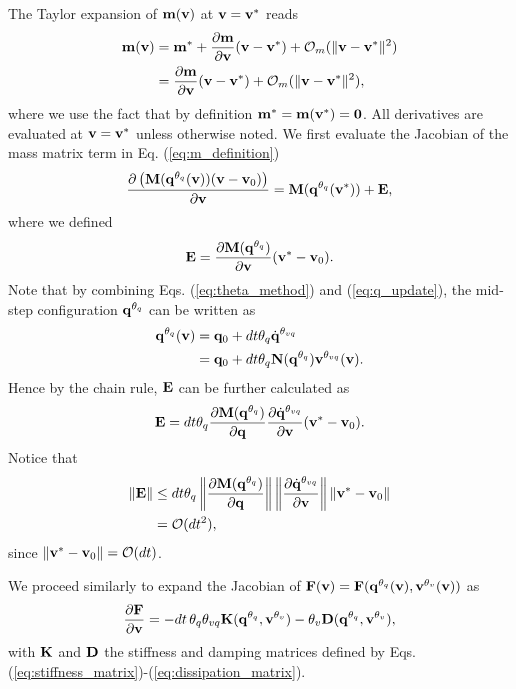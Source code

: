 The Taylor expansion of ${\mathbf{m}}({\mathbf{v}})$ at ${\mathbf{v}}={\mathbf{v}}^*$ reads
\begin{align}
	\mf{m}(\mf{v}) &= \mf{m}^* + \frac{\partial \mf{m}}{\partial \mf{v}} (\mf{v}-\mf{v}^*) +
	\mathcal{O}_m(\Vert\mf{v}-\mf{v}^*\Vert^2)\nonumber\\
	&=\frac{\partial \mf{m}}{\partial \mf{v}}(\mf{v}-\mf{v}^*) +
	\mathcal{O}_m(\Vert\mf{v}-\mf{v}^*\Vert^2),
	\label{eq:m_taylor_expansion}
\end{align}
where we use the fact that by definition ${\mathbf{m}}^*={\mathbf{m}}({\mathbf{v}}^*)={\mathbf{0}}$. All
derivatives are evaluated at ${\mathbf{v}} = {\mathbf{v}}^*$ unless otherwise noted. We
first evaluate the Jacobian of the mass matrix term in Eq.
(\ref{eq:m_definition})
\begin{align*}
	\frac{\partial \left( {\mathbf{M}}({\mathbf{q}}^{\theta_{q}}({\mathbf{v}}))({\mathbf{v}}-{\mathbf{v}}_0) \right)}{\partial {\mathbf{v}}}
	= {\mathbf{M}}({\mathbf{q}}^{\theta_{q}}({\mathbf{v}}^*)) + {\mathbf{E}},
\end{align*}
where we defined
\begin{align*}
	{\mathbf{E}} = \frac{\partial {\mathbf{M}}({\mathbf{q}}^{\theta_{q}})}{\partial{\mathbf{v}}} ({\mathbf{v}}^*-{\mathbf{v}}_0).
\end{align*}
Note that by combining Eqs. (\ref{eq:theta_method}) and (\ref{eq:q_update}), the
mid-step configuration ${\mathbf{q}}^{\theta_q}$ can be written as
\begin{align*}
	{\mathbf{q}}^{\theta_q}({\mathbf{v}}) &= {\mathbf{q}}_0 + dt \theta_q \dot{{\mathbf{q}}}^{\theta_{vq}} \\
	                          &= {\mathbf{q}}_0 + dt \theta_q {\mathbf{N}}({\mathbf{q}}^{\theta_{q}}){\mathbf{v}}^{\theta_{vq}}({\mathbf{v}}).
\end{align*}
Hence by the chain rule, ${\mathbf{E}}$ can be further calculated as
\begin{align*}
	{\mathbf{E}} = dt\theta_q\frac{\partial {\mathbf{M}}({\mathbf{q}}^{\theta_{q}}) }{\partial{\mathbf{q}}}
             \frac{\partial\dot{{\mathbf{q}}}^{\theta_{vq}}}{\partial{\mathbf{v}}}
			 ({\mathbf{v}}^*-{\mathbf{v}}_0).
\end{align*}
Notice that 
\begin{align*}
		\Vert{\mathbf{E}}\Vert 
		&\le dt\theta_q \left\| \frac{\partial{\mathbf{M}}({\mathbf{q}}^{\theta_{q}})}{\partial{\mathbf{q}}}  \right\|
			\left\| \frac{\partial\dot{{\mathbf{q}}}^{\theta_{vq}}}{\partial{\mathbf{v}}}  \right\|
		    \left\| {\mathbf{v}}^*-{\mathbf{v}}_0 \right\| \\
		&= \mathcal{O}(dt^2),
\end{align*}
since $\Vert{\mathbf{v}}^*-{\mathbf{v}}_0\Vert = \mathcal{O}(dt)$.

We proceed similarly to expand the Jacobian of
${\mathbf{F}}({\mathbf{v}})={\mathbf{F}}({\mathbf{q}}^{\theta_{q}}({\mathbf{v}}), {\mathbf{v}}^{\theta_v}({\mathbf{v}}))$
as
\begin{align*}
	\frac{\partial{\mathbf{F}}}{\partial {\mathbf{v}}} = -dt\,\theta_q\theta_{vq}{\mathbf{K}}({\mathbf{q}}^{\theta_q},
	{\mathbf{v}}^{\theta_v})-\theta_v{\mathbf{D}}({\mathbf{q}}^{\theta_q}, {\mathbf{v}}^{\theta_v}),
\end{align*}
with ${\mathbf{K}}$ and ${\mathbf{D}}$ the stiffness and damping matrices defined by Eqs.
(\ref{eq:stiffness_matrix})-(\ref{eq:dissipation_matrix}).

